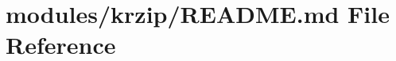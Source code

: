 \hypertarget{modules_2krzip_2README_8md}{\section{modules/krzip/\-R\-E\-A\-D\-M\-E.md File Reference}
\label{modules_2krzip_2README_8md}
}

